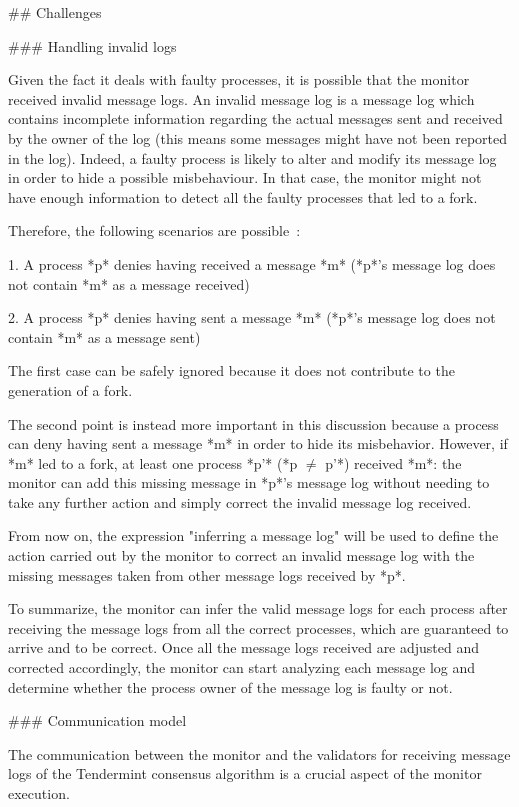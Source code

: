 \documentclass[a4paper,11pt,oneside]{report}
\begin{document}
\begin{markdown}
## Challenges

### Handling invalid logs

Given the fact it deals with faulty processes, it is possible that the monitor received invalid message logs. An invalid message log is a message log which contains incomplete information regarding the actual messages sent and received by the owner of the log (this means some messages might have not been reported in the log).
Indeed, a faulty process is likely to alter and modify its message log in order to hide a possible misbehaviour. In that case, the monitor might not have enough information to detect all the faulty processes that led to a fork. 

Therefore, the following scenarios are possible~\cite{fork-accountability-specs}:
 
1. A process *p* denies having received a message *m* (*p*'s message log does not contain *m* as a message received)  

2. A process *p* denies having sent a message *m* (*p*'s message log does not contain *m* as a message sent) 

The first case can be safely ignored because it does not contribute to the generation of a fork.

The second point is instead more important in this discussion because a process can deny having sent a message *m* in order to hide its misbehavior. 
However, if *m* led to a fork, at least one process *p'* (*p $\neq$ p'*) received *m*: the monitor can add this missing message in *p*'s message log without needing to take any further action and simply correct the invalid message log received. 

From now on, the expression "inferring a message log" will be used to define the action carried out by the monitor to correct an invalid message log with the missing messages taken from other message logs received by *p*.

To summarize, the monitor can infer the valid message logs for each process after receiving the message logs from all the correct processes, which are guaranteed to arrive and to be correct.
Once all the message logs received are adjusted and corrected accordingly, the monitor can start analyzing each message log and determine whether the process owner of the message log is faulty or not.

### Communication model

The communication between the monitor and the validators for receiving message logs of the Tendermint consensus algorithm is a crucial aspect of the monitor execution.


\end{markdown}
\end{document}
